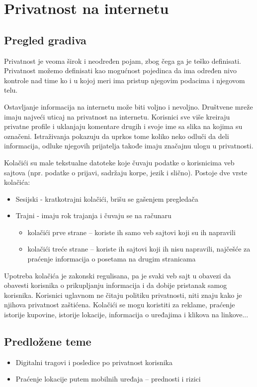 \documentclass[a4paper,12pt]{article}
\begin{document}
\section{Privatnost na internetu}
\subsection{Pregled gradiva}

Privatnost je veoma širok i neodređen pojam, zbog čega ga je teško definisati. Privatnost možemo definisati kao mogućnost pojedinca da ima određen nivo kontrole nad time ko i u kojoj meri ima pristup njegovim podacima i njegovom telu. 

Ostavljanje informacija na internetu može biti voljno i nevoljno. Društvene mreže imaju najveći uticaj na privatnost na internetu. Korisnici sve više kreiraju privatne profile i uklanjaju komentare drugih i svoje ime sa slika na kojima su označeni. Istraživanja pokazuju da uprkos tome koliko neko odluči da deli informacija, odluke njegovih prijatelja takođe imaju značajnu ulogu u privatnosti. 

Kolačići su male tekstualne datoteke koje čuvaju podatke o korisnicima veb sajtova (npr. podatke o prijavi, sadržaju korpe, jezik i slično). Postoje dve vrste kolačića:
\begin{itemize}
    \item Sesijski - kratkotrajni kolačići, brišu se gašenjem pregledača
    \item Trajni - imaju rok trajanja i čuvaju se na računaru
    \begin{itemize}
        \item kolačići prve strane – koriste ih samo veb sajtovi koji su ih napravili
        \item kolačići treće strane – koriste ih sajtovi koji ih nisu napravili, najčešće za praćenje informacija o posetama na drugim stranicama
    \end{itemize}
\end{itemize}
Upotreba kolačića je zakonski regulisana, pa je svaki veb sajt u obavezi da obavesti korisnika o prikupljanju informacija i da dobije pristanak samog korisnika. Korisnici uglavnom ne čitaju politiku privatnosti, niti znaju kako je njihova privatnost zaštićena. Kolačići se mogu koristiti za reklame, praćenje istorije kupovine, istorije lokacije, informacija o uređajima i klikova na linkove...

\subsection{Predložene teme}
\begin{itemize}
    \item Digitalni tragovi i posledice po privatnost korisnika
    \item Praćenje lokacije putem mobilnih uređaja – prednosti i rizici
\end{itemize}
\end{document}

